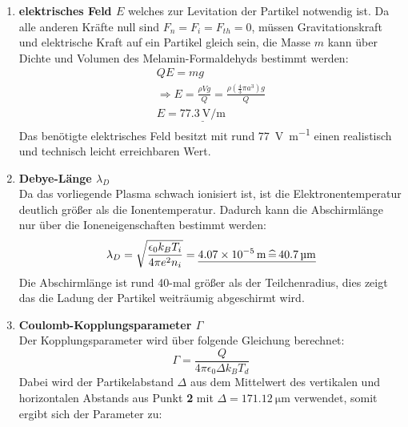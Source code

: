 \documentclass[12pt,a4paper,ngerman]{article}
\begin{document}
\begin{enumerate}[font=\bfseries]
\begin{enumerate}[font=\bfseries, label=\alph*)]
\begin{equation}
			\end{equation}
		Durch einsetzten aller Werte ist die mittlere Ladung:
		\begin{equation}
			|Q| = \underline{\SI{5012}{\elemtLad} \, \widehat{=} \, \SI{8.027E-16}{\coulomb}}
		\end{equation}
		Eine Teilchen im Plasma trägt die Ladung von etwa \SI{5000}{\elemtLad}, angesichts der Größe der Partikel von \SI{1}{\micro \meter} scheint dieser Wert gut zu passen.
	    \item \textbf{elektrisches Feld $E$} welches zur Levitation der Partikel notwendig ist. Da alle anderen Kräfte null sind $F_n = F_i = F_{th} = 0$, müssen Gravitationskraft und elektrische Kraft auf ein Partikel gleich sein, die Masse $m$ kann über Dichte und Volumen des Melamin-Formaldehyds bestimmt werden:
	    \begin{equation}
	    	\begin{split}
	    		Q E = m g \\
	    		\Rightarrow E = \frac{\rho V g}{Q} = \frac{\rho \left(\frac{4}{3} \pi a^3\right) g}{Q}\\
	    		E = \underline{\SI{77.3}{\volt \per \meter}}
	    	\end{split}
	    \end{equation}
    	Das benötigte elektrisches Feld besitzt mit rund \SI{77}{\volt \per \meter} einen realistisch und technisch leicht erreichbaren Wert.
	    \item \textbf{Debye-Länge $\lambda_D$}\\
	     Da das vorliegende Plasma schwach ionisiert ist, ist die Elektronentemperatur deutlich größer als die Ionentemperatur. Dadurch kann die Abschirmlänge nur über die Ioneneigenschaften bestimmt werden:
	    	    \begin{equation}
	    		\lambda_D = \sqrt{\frac{\epsilon_0 k_B T_i}{4 \pi e^2 n_i}} = \underline{\SI{4.07E-5}{\meter}  \, \widehat{=} \,  \SI{40.7}{\micro \meter}}
	    \end{equation}
	    Die Abschirmlänge ist rund 40-mal größer als der Teilchenradius, dies zeigt das die Ladung der Partikel weiträumig abgeschirmt wird. 
	    \item \textbf{Coulomb-Kopplungsparameter $\Gamma$}\\
	    Der Kopplungsparameter wird über folgende Gleichung berechnet:
	    \begin{equation}
	    	\Gamma = \frac{Q}{4 \pi \epsilon_0 \Delta k_B T_d}
	    \end{equation}
    	Dabei wird der Partikelabstand $\Delta$ aus dem Mittelwert des vertikalen und horizontalen Abstands aus Punkt \textbf{2} mit $\Delta =  \SI{171.12}{\micro \meter}$ verwendet, somit ergibt sich der Parameter zu:

\end{enumerate}
\end{enumerate}
\end{document}
